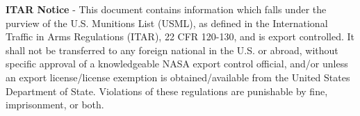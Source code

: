 \textbf{ITAR Notice} - This document contains information which falls under the purview of the U.S. Munitions List (USML), as defined in the International Traffic in Arms Regulations (ITAR), 22 CFR 120-130, and is export controlled. It shall not be transferred to any foreign national in the U.S. or abroad, without specific approval of a knowledgeable NASA export control official, and/or unless an export license/license exemption is obtained/available from the United States Department of State. Violations of these regulations are punishable by fine, imprisonment, or both.